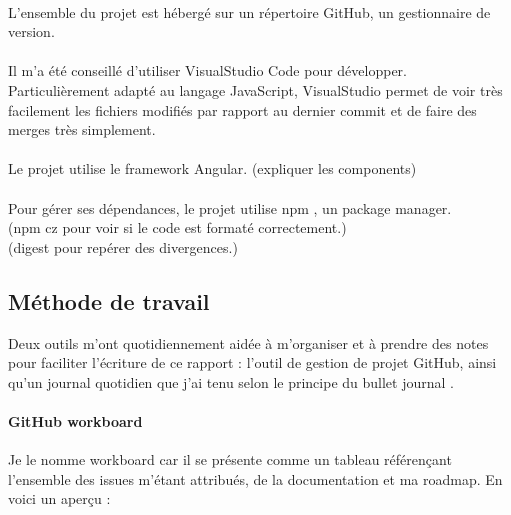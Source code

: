 \documentclass[12pt]{article}
\begin{document}
\paragraph{}
L'ensemble du projet est hébergé sur un répertoire GitHub, un gestionnaire de version.

\paragraph{}
Il m'a été conseillé d'utiliser VisualStudio Code pour développer. Particulièrement adapté au langage JavaScript, VisualStudio permet de voir très facilement les fichiers modifiés par rapport au dernier commit et de faire des merges très simplement.

\paragraph{}
Le projet utilise le framework Angular. (expliquer les components)

\paragraph{}
Pour gérer ses dépendances, le projet utilise npm \cite{npm}, un package manager.\\

(npm cz pour voir si le code est formaté correctement.)\\

(digest pour repérer des divergences.)\\

\subsection{Méthode de travail}
Deux outils m'ont quotidiennement aidée à m'organiser et à prendre des notes pour faciliter l'écriture de ce rapport : l'outil de gestion de projet GitHub, ainsi qu'un journal quotidien que j'ai tenu selon le principe du bullet journal \cite{bullet}.

\paragraph{GitHub workboard}
Je le nomme workboard car il se présente comme un tableau référençant l'ensemble des issues m'étant attribués, de la documentation et ma roadmap. En voici un aperçu :
\end{document}
